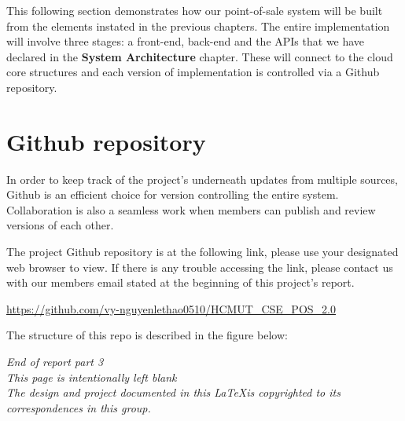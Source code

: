 \documentclass[12pt, a4paper]{article}
\theoremstyle{styleth}
\theoremstyle{styledef}
\begin{document}
This following section demonstrates how our point-of-sale system will be built from the elements instated in the previous chapters. The entire implementation will involve three stages: a front-end, back-end and the APIs that we have declared in the \textbf{System Architecture} chapter. These will connect to the cloud core structures and each version of implementation is controlled via a Github repository.

\setcounter{section}{0}
\section{Github repository}

In order to keep track of the project's underneath updates from multiple sources, Github is an efficient choice for version controlling the entire system. Collaboration is also a seamless work when members can publish and review versions of each other.

\vspace{5mm}
The project Github repository is at the following link, please use your designated web browser to view. If there is any trouble accessing the link, please contact us with our members email stated at the beginning of this project's report.

\vspace{5mm}
\url{https://github.com/vy-nguyenlethao0510/HCMUT\_CSE\_POS\_2.0}

The structure of this repo is described in the figure below:

\newpage
\thispagestyle{empty}
\vspace*{\fill}
\centering
\textit{End of report part 3}\\
\textit{This page is intentionally left blank} \\
\textit{The design and project documented in this \LaTeX is copyrighted to its correspondences in this group.}
\end{document}
